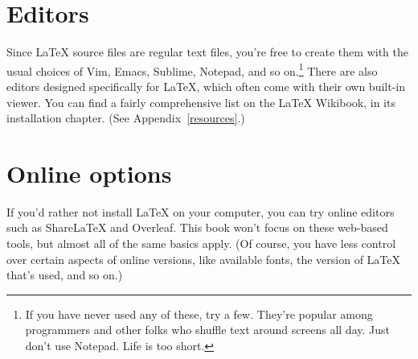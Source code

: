 \section{Editors}

Since \LaTeX{} source files are regular text files,
you're free to create them with the usual choices of Vim, Emacs,
Sublime, Notepad\plusplus, and so on.\punckern\footnote{If you have never used
any of these, try a few.
They're popular among programmers and other folks who shuffle text around
screens all day. Just don't use Notepad. Life is too short.}
There are also editors designed specifically for \LaTeX{},
which often come with their own built-in  viewer.
You can find a fairly comprehensive list on the \LaTeX{} Wikibook,
in its installation chapter. (See Appendix~\ref{resources}.)

\section{Online options}

If you'd rather not install \LaTeX{} on your computer,
you can try online editors such as Share\LaTeX{} and Overleaf.
This book won't focus on these web-based tools,
but almost all of the same basics apply.
(Of course, you have less control over certain aspects of online versions,
like available fonts, the version of \LaTeX{} that's used, and so on.)

